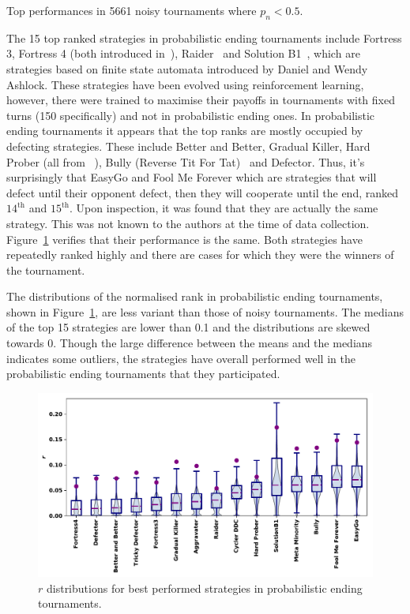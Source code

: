 \documentclass{article}
\begin{document}
\begin{table}[!htbp]
    \centering
    \resizebox{.30\textwidth}{!}{
    }
    \caption{Top performances in 5661 noisy tournaments where \(p_n<0.5\).}\label{table:subset_noise_result}
\end{table}

The 15 top ranked strategies in probabilistic ending tournaments include
Fortress 3, Fortress 4 (both introduced in~\cite{Ashlock2006}),
Raider~\cite{Ashlock2014} and Solution B1~\cite{Ashlock2014}, which are
strategies based on finite state automata introduced by Daniel and Wendy
Ashlock. These strategies have been evolved using reinforcement learning, however,
there were trained to maximise their payoffs in tournaments with fixed turns
(150 specifically) and not in probabilistic ending ones. In probabilistic ending
tournaments it appears that the top ranks are mostly occupied by defecting
strategies. These include Better and Better, Gradual Killer, Hard Prober (all
from ~\cite{prison}), Bully (Reverse Tit For Tat)~\cite{Nachbar1992} and
Defector. Thus, it's surprisingly that EasyGo and Fool Me Forever which are
strategies that will defect until their opponent defect, then they will cooperate
until the end, ranked $14^{\text{th}}$ and $15^{\text{th}}$. Upon inspection,
it was found that they are actually the same strategy. This was not known to
the authors at the time of data collection. Figure~\ref{fig:probend_results}
verifies that their performance is the same. Both strategies have repeatedly
ranked highly and there are cases for which they were the winners of the
tournament.

The distributions of the normalised rank in probabilistic ending tournaments,
shown in
Figure~\ref{fig:probend_results}, are less variant than those of noisy
tournaments. The medians of the top 15 strategies are lower than 0.1 and the distributions are skewed
towards 0. Though the large difference between the means and the medians
indicates some outliers, the strategies have overall performed well in the
probabilistic ending tournaments that they participated.

\begin{figure}[h!]
    \centering
    \includegraphics[width=.7\textwidth]{../images/performance_probend.pdf}
    \caption{\(r\) distributions for best performed strategies in probabilistic ending tournaments.}
    \label{fig:probend_results}
\end{figure}
\end{document}
